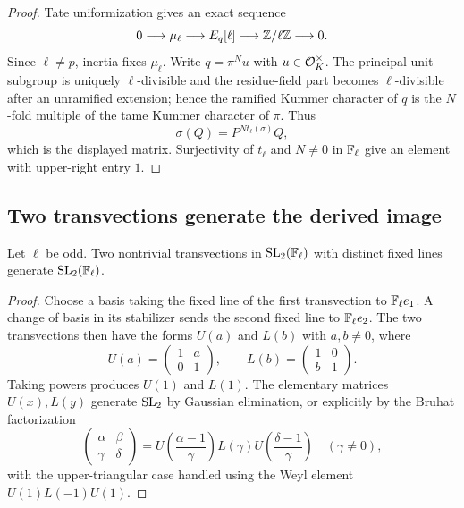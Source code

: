 \begin{proof}
Tate uniformization gives an exact sequence
\[
 0\longrightarrow\mu_\ell
 \longrightarrow E_q[\ell]
 \longrightarrow \mathbb Z/\ell\mathbb Z
 \longrightarrow0.
\]
Since $\ell\ne p$, inertia fixes $\mu_\ell$.  Write $q=\pi^Nu$ with $u\in\mathcal O_K^\times$.  The principal-unit subgroup is uniquely $\ell$-divisible and the residue-field part becomes $\ell$-divisible after an unramified extension; hence the ramified Kummer character of $q$ is the $N$-fold multiple of the tame Kummer character of $\pi$.  Thus
\[
 \sigma(Q)=P^{N t_\ell(\sigma)}Q,
\]
which is the displayed matrix.  Surjectivity of $t_\ell$ and $N\ne0$ in $\mathbb F_\ell$ give an element with upper-right entry $1$.
\end{proof}

\subsection{Two transvections generate the derived image}

\begin{lemma}\label{lem:two-root}
Let $\ell$ be odd.  Two nontrivial transvections in $\operatorname{SL}_2(\mathbb F_\ell)$ with distinct fixed lines generate $\operatorname{SL}_2(\mathbb F_\ell)$.
\end{lemma}

\begin{proof}
Choose a basis taking the fixed line of the first transvection to $\mathbb F_\ell e_1$.  A change of basis in its stabilizer sends the second fixed line to $\mathbb F_\ell e_2$.  The two transvections then have the forms $U(a)$ and $L(b)$ with $a,b\ne0$, where
\[
 U(a)=\begin{pmatrix}1&a\\0&1\end{pmatrix},\qquad
 L(b)=\begin{pmatrix}1&0\\b&1\end{pmatrix}.
\]
Taking powers produces $U(1)$ and $L(1)$.  The elementary matrices $U(x),L(y)$ generate $\operatorname{SL}_2$ by Gaussian elimination, or explicitly by the Bruhat factorization
\[
 \begin{pmatrix}\alpha&\beta\\\gamma&\delta\end{pmatrix}
 =U\!\left(\frac{\alpha-1}{\gamma}\right)
  L(\gamma)
  U\!\left(\frac{\delta-1}{\gamma}\right)
 \quad(\gamma\ne0),
\]
with the upper-triangular case handled using the Weyl element
$U(1)L(-1)U(1)$.
\end{proof}

